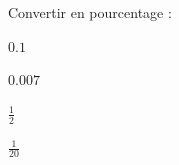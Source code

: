 Convertir en pourcentage :

\debutEntrainement


\begin{enonce}
$\num{0,1}$
\end{enonce}








\begin{enonce}
$\num{0,007}$
\end{enonce}






\begin{enonce}
$\frac{1}{2}$
\end{enonce}






\begin{enonce}
$\frac{1}{20}$
\end{enonce}

